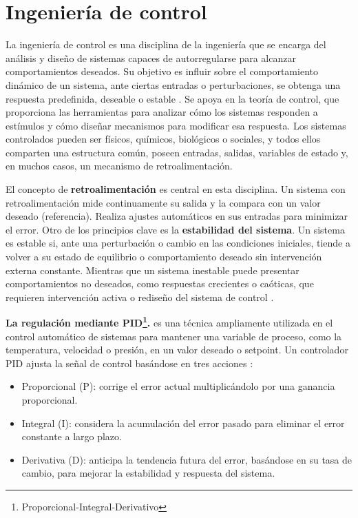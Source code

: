 \section{Ingeniería de control}
La ingeniería de control es una disciplina de la ingeniería que se encarga del análisis y diseño de sistemas capaces de autorregularse para alcanzar comportamientos deseados. Su objetivo es influir sobre el comportamiento dinámico de un sistema, ante ciertas entradas o perturbaciones, se obtenga una respuesta predefinida, deseable o estable \cite{tme_ingenieria_control}. Se apoya en la teoría de control, que proporciona las herramientas para analizar cómo los sistemas responden a estímulos y cómo diseñar mecanismos para modificar esa respuesta. Los sistemas controlados pueden ser físicos, químicos, biológicos o sociales, y todos ellos comparten una estructura común, poseen entradas, salidas, variables de estado y, en muchos casos, un mecanismo de retroalimentación.

El concepto de \textbf{retroalimentación} es central en esta disciplina. Un sistema con retroalimentación mide continuamente su salida y la compara con un valor deseado (referencia). Realiza ajustes automáticos en sus entradas para minimizar el error. Otro de los principios clave es la \textbf{estabilidad del sistema}. Un sistema es estable si, ante una perturbación o cambio en las condiciones iniciales, tiende a volver a su estado de equilibrio o comportamiento deseado sin intervención externa constante. Mientras que un sistema inestable puede presentar comportamientos no deseados, como respuestas crecientes o caóticas, que requieren intervención activa o rediseño del sistema de control \cite{ait_ingenieria_control}.


\textbf{La regulación mediante PID\footnote{Proporcional-Integral-Derivativo}.} es una técnica ampliamente utilizada en el control automático de sistemas para mantener una variable de proceso, como la temperatura, velocidad o presión, en un valor deseado o setpoint. Un controlador PID ajusta la señal de control basándose en tres acciones \cite{mazzone2002controladores}:
\begin{itemize}
    \item Proporcional (P): corrige el error actual multiplicándolo por una ganancia proporcional.
    \item Integral (I): considera la acumulación del error pasado para eliminar el error constante a largo plazo.
    \item Derivativa (D): anticipa la tendencia futura del error, basándose en su tasa de cambio, para mejorar la estabilidad y respuesta del sistema.
\end{itemize}

